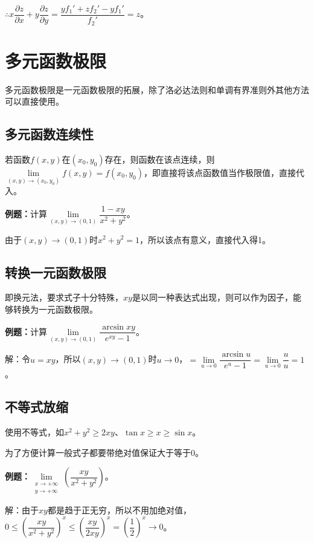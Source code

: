 \documentclass[UTF8, 12pt]{ctexart}
\begin{document}
$\therefore x\dfrac{\partial z}{\partial x}+y\dfrac{\partial z}{\partial y}=\dfrac{yf_1'+zf_2'-yf_1'}{f_2'}=z$。

\section{多元函数极限}

多元函数极限是一元函数极限的拓展，除了洛必达法则和单调有界准则外其他方法可以直接使用。

\subsection{多元函数连续性}

若函数$f(x,y)$在$(x_0,y_0)$存在，则函数在该点连续，则$\lim\limits_{(x,y)\to(x_0,y_0)}f(x,y)=f(x_0,y_0)$，即直接将该点函数值当作极限值，直接代入。

\textbf{例题：}计算$\lim\limits_{(x,y)\to(0,1)}\dfrac{1-xy}{x^2+y^2}$。

由于$(x,y)\to(0,1)$时$x^2+y^2=1$，所以该点有意义，直接代入得1。

\subsection{转换一元函数极限}

即换元法，要求式子十分特殊，$xy$是以同一种表达式出现，则可以作为因子，能够转换为一元函数极限。

\textbf{例题：}计算$\lim\limits_{(x,y)\to(0,1)}\dfrac{\arcsin xy}{e^{xy}-1}$。

解：令$u=xy$，所以$(x,y)\to(0,1)$时$u\to0$，$=\lim\limits_{u\to0}\dfrac{\arcsin u}{e^u-1}=\lim\limits_{u\to0}\dfrac{u}{u}=1$。

\subsection{不等式放缩}

使用不等式，如$x^2+y^2\geqslant2xy$、$\tan x\geqslant x\geqslant\sin x$。

为了方便计算一般式子都要带绝对值保证大于等于0。

\textbf{例题：}$\lim\limits_{\substack{x\to+\infty\\y\to+\infty}}\left(\dfrac{xy}{x^2+y^2}\right)$。

解：由于$xy$都是趋于正无穷，所以不用加绝对值，$0\leqslant\left(\dfrac{xy}{x^2+y^2}\right)^x\leqslant\left(\dfrac{xy}{2xy}\right)^x=\left(\dfrac{1}{2}\right)^x\to0$。
\end{document}
